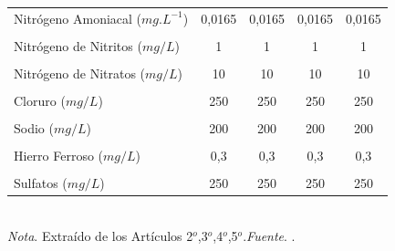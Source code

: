 \begin{table}[htpb]
\begin{tabular}{lcccc}
Nitrógeno Amoniacal ($mg.L^{-1}$)       & 0,0165    & 0,0165     & 0,0165     & 0,0165     \\
                                        &           &            &            &            \\
Nitrógeno de Nitritos ($mg/L$)          & 1         & 1          & 1          & 1          \\
                                        &           &            &            &            \\
Nitrógeno de Nitratos ($mg/L$)          & 10        & 10         & 10         & 10         \\
                                    &           &            &            &            \\ 
Cloruro ($mg /L$)                       & 250       & 250        & 250        & 250        \\
                                        &           &            &            &            \\
Sodio ($mg/L$)                          & 200       & 200        & 200        & 200        \\
                                        &           &            &            &            \\
Hierro Ferroso ($mg/L$)                 & 0,3       & 0,3        & 0,3        & 0,3        \\
                                        &           &            &            &            \\
Sulfatos ($mg/L$)                       & 250       & 250        & 250        & 250       \\
\bottomrule
\end{tabular}
\\
\bigskip
\small \textit{Nota}. Extra\'ido de los Art\'iculos 2$^{o}$,3$^{o}$,4$^{o}$,5$^{o}$.\textit{Fuente}. \cite{secretaria-del-ambiente-2022}.
\end{table}

